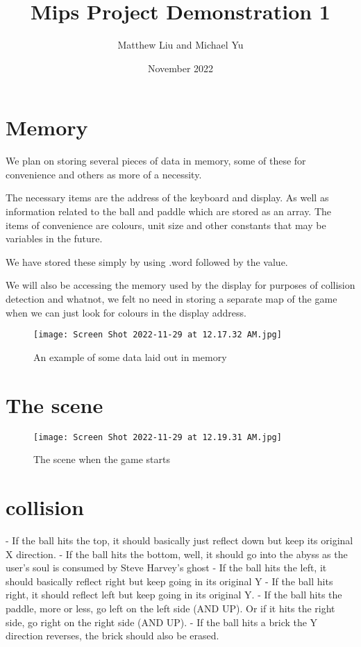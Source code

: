\documentclass{article}
\title{Mips Project Demonstration 1}
\author{Matthew Liu and Michael Yu}
\date{November 2022}
\begin{document}
\maketitle

\section{Memory}

We plan on storing several pieces of data in memory, some of these for convenience and others as more of a necessity. 

The necessary items are the address of the keyboard and display. As well as information related to the ball and paddle which are stored as an array. The items of convenience are colours, unit size and other constants that may be variables in the future. 

We have stored these simply by using .word followed by the value. 

We will also be accessing the memory used by the display for purposes of collision detection and whatnot, we felt no need in storing a separate map of the game when we can just look for colours in the display address. 

\begin{figure}[ht!]
    \centering
    \texttt{[image: Screen Shot 2022-11-29 at 12.17.32 AM.jpg]}
    \caption{An example of some data laid out in memory}
    \label{f:part1_timing}
\end{figure}

\section{The scene}

\begin{figure}[ht!]
    \centering
    \texttt{[image: Screen Shot 2022-11-29 at 12.19.31 AM.jpg]}
    \caption{The scene when the game starts}
    \label{f:part1_timing}
\end{figure}

\section{collision}

- If the ball hits the top, it should basically just reflect down but keep its original X direction.
- If the ball hits the bottom, well, it should go into the abyss as the user's soul is consumed by Steve Harvey's ghost
- If the ball hits the left, it should basically reflect right but keep going in its original Y
- If the ball hits right, it should reflect left but keep going in its original Y.
- If the ball hits the paddle, more or less, go left on the left side (AND UP). Or if it hits the right side, go right on the right side (AND UP). 
- If the ball hits a brick the Y direction reverses, the brick should also be erased. 
\end{document}

